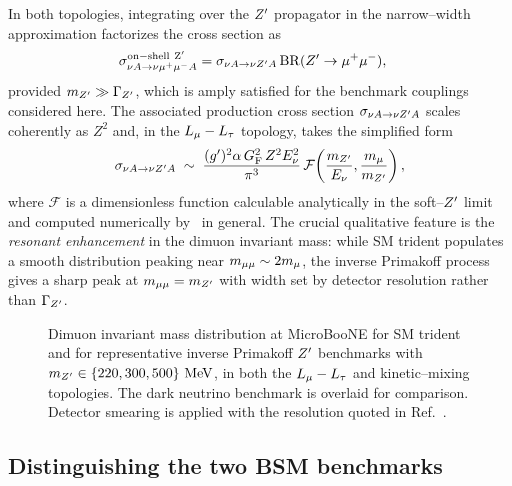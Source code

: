 In both topologies, integrating over the $Z^{\prime}$ propagator in the
narrow--width approximation factorizes the cross section as
\begin{align}
  \sigma_{\nu A \to \nu \mu^+\mu^- A}^{\rm on-shell\ Z^{\prime}}
  =\;& \sigma_{\nu A \to \nu Z^{\prime} A}\,
       \mathrm{BR}(Z^{\prime} \to \mu^+\mu^-),
  \label{eq:NWA}
\end{align}
provided $m_{Z^{\prime}} \gg \Gamma_{Z^{\prime}}$, which is amply satisfied for the
benchmark couplings considered here.  The associated production cross
section $\sigma_{\nu A \to \nu Z^{\prime} A}$ scales coherently as $Z^2$ and,
in the $L_\mu - L_\tau$ topology, takes the simplified form
\begin{equation}
  \sigma_{\nu A \to \nu Z^{\prime} A}
  \;\sim\;
  \frac{(g')^2 \alpha\, G_{\rm F}^2\, Z^2 E_\nu^2}{\pi^3}\,
  \mathcal{F}\!\left(\frac{m_{Z^{\prime}}}{E_\nu},\frac{m_\mu}{m_{Z^{\prime}}}\right),
  \label{eq:invPrim-xsec}
\end{equation}
where $\mathcal{F}$ is a dimensionless function calculable
analytically in the soft--$Z^{\prime}$ limit and computed numerically by
\Neptune\ in general.  The crucial qualitative feature is the
\emph{resonant enhancement} in the dimuon invariant mass: while SM
trident populates a smooth distribution peaking near
$m_{\mu\mu} \sim 2m_\mu$, the inverse Primakoff process gives a sharp
peak at $m_{\mu\mu} = m_{Z^{\prime}}$ with width set by detector resolution
rather than $\Gamma_{Z^{\prime}}$.

\begin{figure}[t]
  \centering
  \caption{Dimuon invariant mass distribution at MicroBooNE for SM
    trident and for representative inverse Primakoff $Z^{\prime}$ benchmarks
    with $m_{Z^{\prime}} \in \{220, 300, 500\}~\text{MeV}$, in both the
    $L_\mu - L_\tau$ and kinetic--mixing topologies.  The dark neutrino
    benchmark is overlaid for comparison.  Detector smearing is
    applied with the resolution quoted in Ref.~\cite{SBN-proposal}.}
  \label{fig:mmumu}
\end{figure}

\subsection{Distinguishing the two BSM benchmarks}

